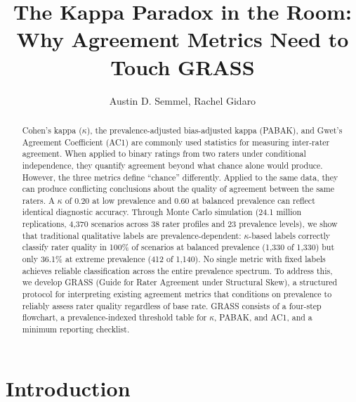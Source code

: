 \documentclass[11pt]{article}
\title{\textbf{The Kappa Paradox in the Room:\\Why Agreement Metrics Need to Touch GRASS}}
\author{Austin D. Semmel, Rachel Gidaro}
\date{}
\begin{document}
\maketitle
\vspace{-1cm}

\begin{abstract}
\noindent Cohen's kappa ($\kappa$), the prevalence-adjusted bias-adjusted kappa (PABAK), and Gwet's Agreement Coefficient (AC1) are commonly used statistics for measuring inter-rater agreement. When applied to binary ratings from two raters under conditional independence, they quantify agreement beyond what chance alone would produce. However, the three metrics define ``chance'' differently. Applied to the same data, they can produce conflicting conclusions about the quality of agreement between the same raters. A $\kappa$ of 0.20 at low prevalence and 0.60 at balanced prevalence can reflect identical diagnostic accuracy. Through Monte Carlo simulation (24.1 million replications, 4,370 scenarios across 38 rater profiles and 23 prevalence levels), we show that traditional qualitative labels \citep{landis1977measurement} are prevalence-dependent: $\kappa$-based labels correctly classify rater quality in 100\% of scenarios at balanced prevalence (1,330 of 1,330) but only 36.1\% at extreme prevalence (412 of 1,140). No single metric with fixed labels achieves reliable classification across the entire prevalence spectrum. To address this, we develop GRASS (Guide for Rater Agreement under Structural Skew), a structured protocol for interpreting existing agreement metrics that conditions on prevalence to reliably assess rater quality regardless of base rate. GRASS consists of a four-step flowchart, a prevalence-indexed threshold table for $\kappa$, PABAK, and AC1, and a minimum reporting checklist.
\end{abstract}

\section*{Introduction}
\end{document}
